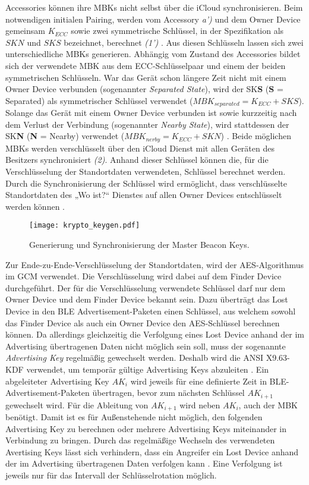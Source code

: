 Accessories können ihre \acp{MBK} nicht selbst über die iCloud synchronisieren.
Beim notwendigen initialen Pairing, werden vom Accessory \textit{a')} und dem Owner Device gemeinsam $K_{ECC}$ sowie zwei symmetrische Schlüssel, in der Spezifikation als $SKN$ und $SKS$ bezeichnet, berechnet \textit{(1')} \cite{Apple_FindMySpec}.
Aus diesen Schlüsseln lassen sich zwei unterschiedliche \acp{MBK} generieren.
Abhängig vom Zustand des Accessories bildet sich der verwendete \ac{MBK} aus dem \ac{ECC}-Schlüsselpaar und einem der beiden symmetrischen Schlüsseln.
War das Gerät schon längere Zeit nicht mit einem Owner Device verbunden (sogenannter \textit{Separated State}), wird der SK\textbf{S} (\textbf{S} = Separated) als symmetrischer Schlüssel verwendet ($MBK_{separated} = K_{ECC} + SKS$).
Solange das Gerät mit einem Owner Device verbunden ist sowie kurzzeitig nach dem Verlust der Verbindung (sogenannter \textit{Nearby State}), wird stattdessen der SK\textbf{N} (\textbf{N} = Nearby) verwendet ($MBK_{nerby} = K_{ECC} + SKN$) \cite{Apple_FindMySpec}.
Beide möglichen \acp{MBK} werden verschlüsselt über den iCloud Dienst mit allen Geräten des Besitzers synchronisiert \textit{(2)}.
Anhand dieser Schlüssel können die, für die Verschlüsselung der Standortdaten verwendeten, Schlüssel berechnet werden.
Durch die Synchronisierung der Schlüssel wird ermöglicht, dass verschlüsselte Standortdaten des „Wo ist?“ Dienstes auf allen Owner Devices entschlüsselt werden können \cite{Heinrich_FindMy}.
\begin{figure}[ht]
    \centering
    \texttt{[image: krypto\_keygen.pdf]}
    \caption{Generierung und Synchronisierung der Master Beacon Keys.}
    \label{fig:crypto_keygen}
\end{figure}


Zur Ende-zu-Ende-Verschlüsselung der Standortdaten, wird der \ac{AES}-Algorithmus im \ac{GCM} verwendet.
Die Verschlüsselung wird dabei  auf dem Finder Device durchgeführt.
Der für die Verschlüsselung verwendete Schlüssel darf nur dem Owner Device und dem Finder Device bekannt sein.
Dazu überträgt das Lost Device in den \ac{BLE} Advertisement-Paketen einen Schlüssel, aus welchem sowohl das Finder Device als auch ein Owner Device den \ac{AES}-Schlüssel berechnen können.
Da allerdings gleichzeitig die Verfolgung eines Lost Device anhand der im Advertising übertragenen Daten nicht möglich sein soll, muss der sogenannte \textit{Advertising Key} regelmäßig gewechselt werden.
Deshalb wird die ANSI X9.63-\ac{KDF} verwendet, um temporär gültige Advertising Keys abzuleiten \cite{Apple_FindMySpec,Heinrich_FindMy}.
Ein abgeleiteter Advertising Key $AK_i$ wird jeweils für eine definierte Zeit in \ac{BLE}-Advertisement-Paketen übertragen, bevor zum nächsten Schlüssel $AK_{i+1}$ gewechselt wird.
Für die Ableitung von $AK_{i+1}$ wird neben $AK_{i}$, auch der \ac{MBK} benötigt.
Damit ist es für Außenstehende nicht möglich, den folgenden Advertising Key zu berechnen oder mehrere Advertising Keys miteinander in Verbindung zu bringen.
Durch das regelmäßige Wechseln des verwendeten Avertising Keys lässt sich verhindern, dass ein Angreifer ein Lost Device anhand der im Advertising übertragenen Daten verfolgen kann \cite{Heinrich_FindMy}.
Eine Verfolgung ist jeweils nur für das Intervall der Schlüsselrotation möglich.

